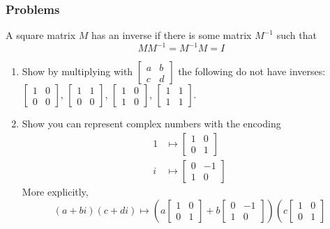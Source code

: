 \documentclass{scrartcl}
\begin{document}
\subsubsection*{Problems}
A square matrix $M$ has an inverse if there is some matrix $M^{-1}$ such that
\[
  MM^{-1}=M^{-1}M = I
\]
\begin{enumerate}
  \item
    Show by multiplying with $
\begin{bmatrix}
  a & b \\ c & d
\end{bmatrix}$
the following do not have inverses:
  $ \begin{bmatrix}
      1 & 0 \\ 0 & 0
    \end{bmatrix} $,
    $\begin{bmatrix}
      1 & 1 \\ 0 & 0
    \end{bmatrix}
    $,
  $
    \begin{bmatrix}
      1 & 0 \\ 1 & 0
    \end{bmatrix}
    $,
    $
    \begin{bmatrix}
      1 & 1 \\ 1 & 1
    \end{bmatrix} $.
  \item \label{complex-as-matrix}
    Show you can represent complex numbers with the encoding
  \begin{align*}
   1 &\mapsto
       \begin{bmatrix}
         1 & 0\\ 0 & 1
       \end{bmatrix}
\\
    i&\mapsto \begin{bmatrix} 0 & -1 \\ 1 & 0 \end{bmatrix}
  \end{align*}
   More explicitly,
  \[
    (a+bi)(c+di)\mapsto\left (a
    \begin{bmatrix}
     1 & 0 \\ 0 & 1
    \end{bmatrix}
    + b
    \begin{bmatrix}
      0 & -1 \\ 1 & 0
    \end{bmatrix} \right)
  \left(c
     \begin{bmatrix}
     1 & 0 \\ 0 & 1

\end{bmatrix}\]
\end{enumerate}
\end{document}
